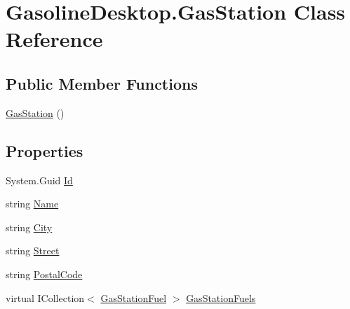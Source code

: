 \hypertarget{class_gasoline_desktop_1_1_gas_station}{}\section{Gasoline\+Desktop.\+Gas\+Station Class Reference}
\label{class_gasoline_desktop_1_1_gas_station}
\subsection*{Public Member Functions}
\begin{DoxyCompactItemize}
\item 
\mbox{\hyperlink{class_gasoline_desktop_1_1_gas_station_a36a4c7b8bacf43e445e1f75ad2f057d0}{Gas\+Station}} ()
\end{DoxyCompactItemize}
\subsection*{Properties}
\begin{DoxyCompactItemize}
\item 
System.\+Guid \mbox{\hyperlink{class_gasoline_desktop_1_1_gas_station_af5fe5e2f8b593cf8f16eb705ee526891}{Id}}
\item 
string \mbox{\hyperlink{class_gasoline_desktop_1_1_gas_station_a9117479148efb671e789906746db6048}{Name}}
\item 
string \mbox{\hyperlink{class_gasoline_desktop_1_1_gas_station_a018700a45aa25a8f8bc273dee80ea700}{City}}
\item 
string \mbox{\hyperlink{class_gasoline_desktop_1_1_gas_station_a8615f04c5dc60322b32dcea0bb6fac0f}{Street}}
\item 
string \mbox{\hyperlink{class_gasoline_desktop_1_1_gas_station_a49a736ddf5a946b0ecf7431f42006c17}{Postal\+Code}}
\item 
virtual I\+Collection$<$ \mbox{\hyperlink{class_gasoline_desktop_1_1_gas_station_fuel}{Gas\+Station\+Fuel}} $>$ \mbox{\hyperlink{class_gasoline_desktop_1_1_gas_station_af3f36d113c7ac64532ac0cf3630cc8f6}{Gas\+Station\+Fuels}}
\end{DoxyCompactItemize}


